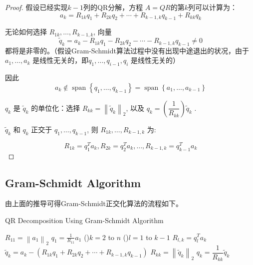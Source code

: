 \begin{proof}


    假设已经实现$k - 1$列的QR分解，方程 $A= QR$的第$k$列可以计算为：
$$
a_{k}=R_{1 k} q_{1}+R_{2 k} q_{2}+\cdots+R_{k-1, k} q_{k-1}+R_{k k} q_{k}
$$

无论如何选择 $R_{1 k}, \ldots, R_{k-1, k}$, 向量
$$
\tilde{q}_{k}=a_{k}-R_{1 k} q_{1}-R_{2 k} q_{2}-\cdots-R_{k-1, k} q_{k-1} \neq 0
$$
都将是非零的。（假设Gram-Schmidt算法过程中没有出现中途退出的状况，由于$a_{1}, \ldots, a_{k}$ 是线性无关的，即$q_{1}, \ldots, q_{i-1}, q_{i} $ 是线性无关的）

因此
$$
a_{k} \notin \operatorname{span}\left\{q_{1}, \ldots, q_{k-1}\right\}=\operatorname{span}\left\{a_{1}, \ldots, a_{k-1}\right\}
$$

$q_{k}$ 是 $\tilde{q}_{k}$ 的单位化：选择 $R_{k k}=\left\|\tilde{q}_{k}\right\|_{2}$, 以及 $q_{k}=\left(\dfrac{1}{R_{kk}} \right) \tilde{q}_{k}$ . 

$\tilde{q}_{k}$ 和 $q_{k}$ 正交于 $q_{1}, \ldots, q_{k-1}$, 则 $R_{1 k}, \ldots, R_{k-1, k}$ 为:

$$R_{1 k}=q_{1}^{T} a_{k},  R_{2 k}=q_{2}^{T} a_{k}, \ldots,  R_{k-1, k}=q_{k-1}^{T} a_{k}$$
\end{proof}

\subsection{Gram-Schmidt Algorithm}

由上面的推导可得Gram-Schmidt正交化算法的流程如下。

\begin{algorithm}[htbp]
    \caption{QR Decomposition Using Gram-Schmidt Algorithm}


    $R_{11}=\left\|a_{1}\right\|_{2}$ \;
     $q_{1}=\frac{1}{R_{11}} a_{1}$ \;
\For(){$k=2$ to $n$}{
    \For(){$l=1$ to $k-1$}{
$R_{l, k} =q_{l}^{T} a_{k}$ \;}
$\tilde{q}_{k} =a_{k}-\left(R_{1 k} q_{1}+R_{2 k} q_{2}+\cdots+R_{k-1, k} q_{k-1}\right)$ \;
$R_{k k} =\left\|\tilde{q}_{k}\right\|_{2}$ \;
 $q_{k} =\dfrac{1}{R_{k k}} \tilde{q}_{k}$ \;
}
\end{algorithm}


